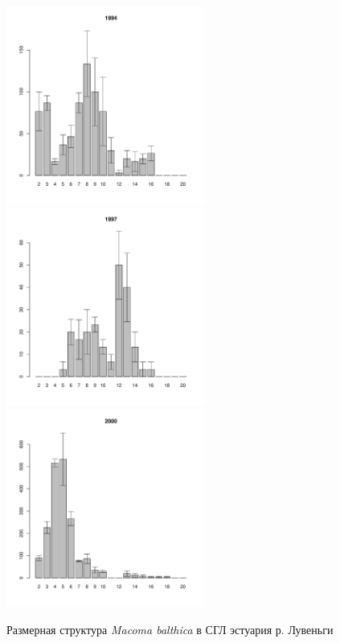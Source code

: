 \documentclass[12pt, a4paper]{article}
\begin{document}
\begin{figure}[h]
\begin{multicols}{3}
\hfill
\includegraphics[width=65mm]{../White_Sea/Estuatiy_Luvenga/sizestr2_1994_.pdf}
\hfill
\includegraphics[width=65mm]{../White_Sea/Estuatiy_Luvenga/sizestr2_1997_.pdf}
\hfill
\includegraphics[width=65mm]{../White_Sea/Estuatiy_Luvenga/sizestr2_2000_.pdf}
\end{multicols}



\caption{Размерная структура {\it Macoma balthica} в СГЛ эстуария р. Лувеньги}
\label{ris:size_str_estuary_Luv}
\end{figure}
\end{document}
